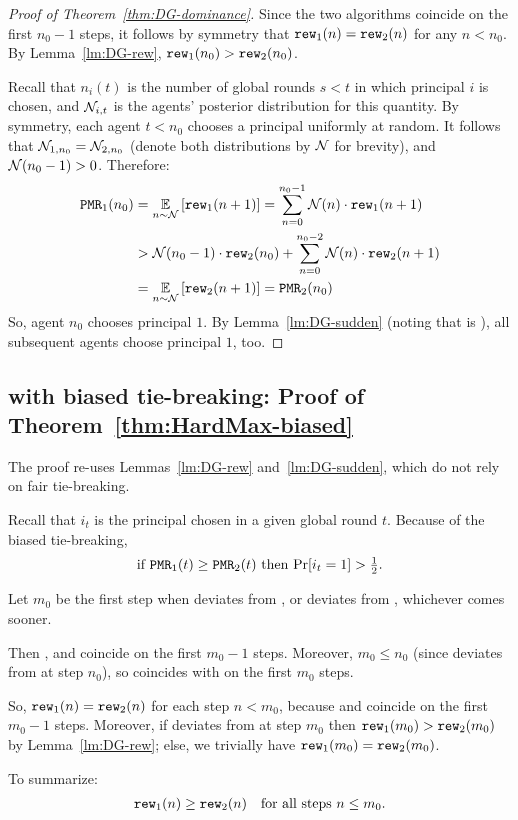 \begin{proof}[Proof of Theorem~\ref{thm:DG-dominance}]
Since the two algorithms coincide on the first $n_0-1$ steps, it follows by symmetry that $\mathtt{rew}_1(n) = \mathtt{rew}_2(n)$ for any $n< n_0$.
By Lemma~\ref{lm:DG-rew},
    $\mathtt{rew}_1(n_0) > \mathtt{rew}_2(n_0)$.

Recall that $n_i(t)$ is the number of global rounds $s<t$ in which principal $i$ is chosen, and $\mathcal{N}_{i,t}$ is the agents' posterior distribution for this quantity. By symmetry, each agent $t<n_0$ chooses a principal uniformly at random. It follows that
    $\mathcal{N}_{1,n_0} = \mathcal{N}_{2,n_0}$
(denote both distributions by $\mathcal{N}$ for brevity), and $\mathcal{N}(n_0-1)>0$.
Therefore:
\begin{align}
\PMR_1(n_0)
  &= \Ex{n\sim \mN} {\rew_1(n+ 1)}
   = \sum_{n = 0}^{n_0-1} \mN(n) \cdot{\rew_1(n + 1)} \nonumber \\
  & > \mN(n_0-1)\cdot {\rew_2(n_0)} + \sum_{n = 0}^{n_0-2}  \mN(n)\cdot{\rew_2(n + 1)}
    \nonumber \\
  &= \Ex{n\sim \mN}{\rew_2(n + 1)} = \PMR_2(n_0) \label{eq:pf:thm:DG-dominance}
\end{align}
So, agent $n_0$ chooses principal $1$. By Lemma~\ref{lm:DG-sudden} {(noting that \DynGreedy is \bmonotone)}, all subsequent agents choose principal $1$, too.
\end{proof}

\subsection{\HardMax with biased tie-breaking:
Proof of Theorem~\ref{thm:HardMax-biased}}
\label{sec:proofs-HM-main}

The proof re-uses Lemmas~\ref{lm:DG-rew} and~\ref{lm:DG-sudden}, which do not rely on fair tie-breaking.

Recall that $i_t$ is the principal chosen in a given global round $t$.
Because of the biased tie-breaking,
\begin{align}\label{eq:thm:HardMax-biased-PMRtoPr}
\text{if $\mathtt{PMR}_1(t)\geq \mathtt{PMR}_2(t)$ then $\Pr[i_t=1]>\tfrac12$.}
\end{align}

Let $m_0$ be the first step when \alg[2] deviates from \DynGreedy, or \DynGreedy deviates from \StaticGreedy, whichever comes sooner. {Then \alg[2], \DynGreedy and \StaticGreedy coincide on the first $m_0-1$ steps. Moreover, $m_0\leq n_0$ (since \DynGreedy deviates from \StaticGreedy at step $n_0$), so \alg[1] coincides with \DynGreedy on the first $m_0$ steps.

So, $\mathtt{rew}_1(n)=\mathtt{rew}_2(n)$ for each step $n<m_0$, because \alg[1] and \alg[2] coincide on the first $m_0-1$ steps. Moreover, if \alg[2] deviates from \DynGreedy at step $m_0$ then
    $\mathtt{rew}_1(m_0) > \mathtt{rew}_2(m_0)$
by Lemma~\ref{lm:DG-rew}; else, we trivially have
    $\mathtt{rew}_1(m_0) = \mathtt{rew}_2(m_0)$.} To summarize:
\begin{align}\label{eq:thm:HardMax-biased-rew}
    \mathtt{rew}_1(n)\geq\mathtt{rew}_2(n)\quad \text{for all steps $n\leq m_0$}.
\end{align}


